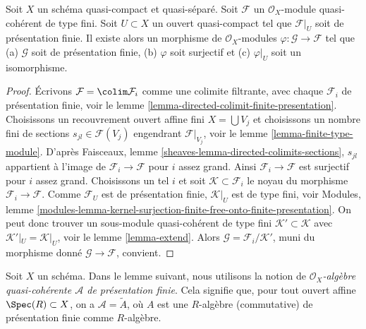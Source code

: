 \begin{lemma}
\label{lemma-application-directed-colimit}
Soit $X$ un schéma quasi-compact et quasi-séparé.
Soit $\mathcal{F}$ un $\mathcal{O}_X$-module quasi-cohérent de type
fini. Soit $U \subset X$ un ouvert quasi-compact tel que $\mathcal{F}|_U$
soit de présentation finie. Il existe alors un morphisme de $\mathcal{O}_X$-modules
$\varphi : \mathcal{G} \to \mathcal{F}$ tel
que (a) $\mathcal{G}$ soit de présentation finie,
(b) $\varphi$ soit surjectif et
(c) $\varphi|_U$ soit un isomorphisme.
\end{lemma}

\begin{proof}
Écrivons $\mathcal{F} = \colim \mathcal{F}_i$ comme une colimite filtrante,
avec chaque $\mathcal{F}_i$ de présentation finie,
voir le lemme \ref{lemma-directed-colimit-finite-presentation}.
Choisissons un recouvrement ouvert affine fini $X = \bigcup V_j$ et
choisissons un nombre fini de sections $s_{jl} \in \mathcal{F}(V_j)$ engendrant
$\mathcal{F}|_{V_j}$, voir le lemme \ref{lemma-finite-type-module}.
D'après Faisceaux, lemme \ref{sheaves-lemma-directed-colimits-sections},
$s_{jl}$ appartient à l'image de $\mathcal{F}_i \to \mathcal{F}$
pour $i$ assez grand. Ainsi $\mathcal{F}_i \to \mathcal{F}$ est surjectif
pour $i$ assez grand. Choisissons un tel $i$ et soit
$\mathcal{K} \subset \mathcal{F}_i$ le noyau du morphisme
$\mathcal{F}_i \to \mathcal{F}$. Comme $\mathcal{F}_U$ est de
présentation finie, $\mathcal{K}|_U$ est de type fini, voir
Modules, lemme
\ref{modules-lemma-kernel-surjection-finite-free-onto-finite-presentation}.
On peut donc trouver un sous-module quasi-cohérent de type fini
$\mathcal{K}' \subset \mathcal{K}$ avec $\mathcal{K}'|_U = \mathcal{K}|_U$,
voir le lemme \ref{lemma-extend}. Alors
$\mathcal{G} = \mathcal{F}_i/\mathcal{K}'$,
muni du morphisme donné $\mathcal{G} \to \mathcal{F}$, convient.
\end{proof}

\noindent
Soit $X$ un schéma. Dans le lemme suivant, nous utilisons la
notion de {\it  $\mathcal{O}_X$-algèbre quasi-cohérente $\mathcal{A}$
de présentation finie}. Cela signifie que, pour tout ouvert affine
$\Spec(R) \subset X$, on a $\mathcal{A} = \widetilde{A}$,
où $A$ est une $R$-algèbre (commutative) de présentation finie
comme $R$-algèbre.

